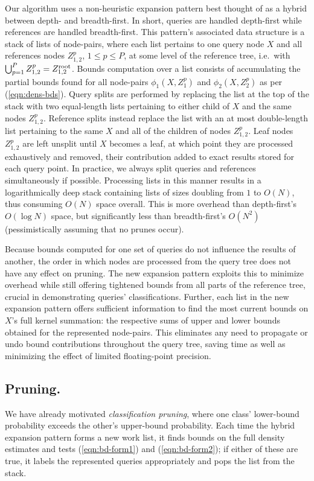 \documentclass[twoside,leqno,twocolumn]{article}
\newcommand{\kdroot}[1]{#1^{\rm root}}
\begin{document}
Our algorithm uses a non-heuristic expansion pattern best thought of
as a hybrid between depth- and breadth-first.  In short, queries are
handled depth-first while references are handled breadth-first.  This
pattern's associated data structure is a stack of lists of node-pairs,
where each list pertains to one query node $X$ and all references
nodes $Z_{1,2}^p$, $1 \leq p \leq P$, at some level of the reference
tree, i.e.~with $\bigcup_{p=1}^P Z_{1,2}^p = \kdroot{Z_{1,2}}$.
Bounds computation over a list consists of accumulating the partial
bounds found for all node-pairs $\phi_1(X,Z_1^p)$ and
$\phi_2(X,Z_2^p)$ as per (\ref{eqn:dens-bds}).  Query splits are
performed by replacing the list at the top of the stack with two
equal-length lists pertaining to either child of $X$ and the same
nodes $Z_{1,2}^p$.  Reference splits instead replace the list with an
at most double-length list pertaining to the same $X$ and all of the
children of nodes $Z_{1,2}^p$.  Leaf nodes $Z_{1,2}^p$ are left
unsplit until $X$ becomes a leaf, at which point they are processed
exhaustively and removed, their contribution added to exact results
stored for each query point.  In practice, we always split queries and
references simultaneously if possible.  Processing lists in this
manner results in a logarithmically deep stack containing lists of
sizes doubling from $1$ to $O(N)$, thus consuming $O(N)$ space
overall.  This is more overhead than depth-first's $O(\log N)$ space,
but significantly less than breadth-first's $O(N^2)$ (pessimistically
assuming that no prunes occur).

Because bounds computed for one set of queries do not influence the
results of another, the order in which nodes are processed from the
query tree does not have any effect on pruning.  The new expansion
pattern exploits this to minimize overhead while still offering
tightened bounds from all parts of the reference tree, crucial in
demonstrating queries' classifications.  Further, each list in the new
expansion pattern offers sufficient information to find the most
current bounds on $X$'s full kernel summation: the respective sums of
upper and lower bounds obtained for the represented node-pairs.  This
eliminates any need to propagate or undo bound contributions
throughout the query tree, saving time as well as minimizing the
effect of limited floating-point precision.

\subsection{Pruning.}
We have already motivated {\em classification pruning}, where one
class' lower-bound probability exceeds the other's upper-bound
probability.  Each time the hybrid expansion pattern forms a new work
list, it finds bounds on the full density estimates and tests
(\ref{eqn:bd-form1}) and (\ref{eqn:bd-form2}); if either of these are
true, it labels the represented queries appropriately and pops the
list from the stack.
\end{document}
